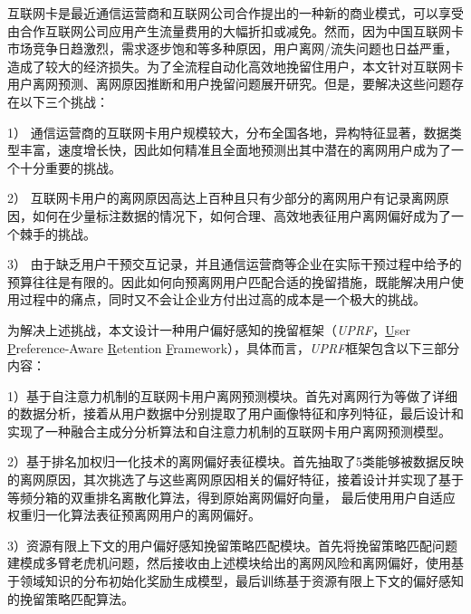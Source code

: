 
\begin{abstractcn}\setlength{\baselineskip}{20pt}%
	
	互联网卡是最近通信运营商和互联网公司合作提出的一种新的商业模式，可以享受由合作互联网公司应用产生流量费用的大幅折扣或减免。然而，因为中国互联网卡市场竞争日趋激烈，需求逐步饱和等多种原因，用户离网/流失问题也日益严重，造成了较大的经济损失。为了全流程自动化高效地挽留住用户，本文针对互联网卡用户离网预测、离网原因推断和用户挽留问题展开研究。但是，要解决这些问题存在以下三个挑战：
	\par
	1） 通信运营商的互联网卡用户规模较大，分布全国各地，异构特征显著，数据类型丰富，速度增长快，因此如何精准且全面地预测出其中潜在的离网用户成为了一个十分重要的挑战。\par
	2） 互联网卡用户的离网原因高达上百种且只有少部分的离网用户有记录离网原因，如何在少量标注数据的情况下，如何合理、高效地表征用户离网偏好成为了一个棘手的挑战。\par
	3） 由于缺乏用户干预交互记录，并且通信运营商等企业在实际干预过程中给予的预算往往是有限的。因此如何向预离网用户匹配合适的挽留措施，既能解决用户使用过程中的痛点，同时又不会让企业方付出过高的成本是一个极大的挑战。\par
	为解决上述挑战，本文设计一种用户偏好感知的挽留框架（\emph{UPRF}，\underline{U}ser \underline{P}reference-Aware \underline{R}etention \underline{F}ramework），具体而言，\emph{UPRF}框架包含以下三部分内容：\par
	1）基于自注意力机制的互联网卡用户离网预测模块。首先对离网行为等做了详细的数据分析，接着从用户数据中分别提取了用户画像特征和序列特征，最后设计和实现了一种融合主成分分析算法和自注意力机制的互联网卡用户离网预测模型。	\par
	2）基于排名加权归一化技术的离网偏好表征模块。首先抽取了5类能够被数据反映的离网原因，其次挑选了与这些离网原因相关的偏好特征，接着设计并实现了基于等频分箱的双重排名离散化算法，得到原始离网偏好向量，
	最后使用用户自适应权重归一化算法表征预离网用户的离网偏好。		         \par
	3）资源有限上下文的用户偏好感知挽留策略匹配模块。首先将挽留策略匹配问题建模成多臂老虎机问题，然后接收由上述模块给出的离网风险和离网偏好，使用基于领域知识的分布初始化奖励生成模型，最后训练基于资源有限上下文的偏好感知的挽留策略匹配算法。	

\end{abstractcn}
